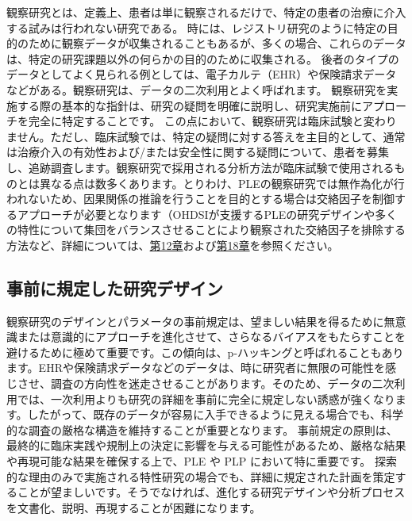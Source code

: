 \documentclass[
  11pt]{book}
\theoremstyle{definition}
\theoremstyle{definition}
\theoremstyle{definition}
\theoremstyle{definition}
\theoremstyle{remark}
\begin{document}
観察研究とは、定義上、患者は単に観察されるだけで、特定の患者の治療に介入する試みは行われない研究である。 時には、レジストリ研究のように特定の目的のために観察データが収集されることもあるが、多くの場合、これらのデータは、特定の研究課題以外の何らかの目的のために収集される。 後者のタイプのデータとしてよく見られる例としては、電子カルテ（EHR）や保険請求データなどがある。観察研究は、データの二次利用とよく呼ばれます。 観察研究を実施する際の基本的な指針は、研究の疑問を明確に説明し、研究実施前にアプローチを完全に特定することです。 この点において、観察研究は臨床試験と変わりません。ただし、臨床試験では、特定の疑問に対する答えを主目的として、通常は治療介入の有効性および/または安全性に関する疑問について、患者を募集し、追跡調査します。観察研究で採用される分析方法が臨床試験で使用されるものとは異なる点は数多くあります。とりわけ、PLEの観察研究では無作為化が行われないため、因果関係の推論を行うことを目的とする場合は交絡因子を制御するアプローチが必要となります（OHDSIが支援するPLEの研究デザインや多くの特性について集団をバランスさせることにより観察された交絡因子を排除する方法など、詳細については、\href{https://ohdsi.github.io/TheBookOfOhdsi/PopulationLevelEstimation.html\#PopulationLevelEstimation}{第12章}および\href{https://ohdsi.github.io/TheBookOfOhdsi/MethodValidity.html\#MethodValidity}{第18章}を参照ください。

\subsection{事前に規定した研究デザイン}\label{ux4e8bux524dux306bux898fux5b9aux3057ux305fux7814ux7a76ux30c7ux30b6ux30a4ux30f3}

観察研究のデザインとパラメータの事前規定は、望ましい結果を得るために無意識または意識的にアプローチを進化させて、さらなるバイアスをもたらすことを避けるために極めて重要です。この傾向は、p-ハッキングと呼ばれることもあります。EHRや保険請求データなどのデータは、時に研究者に無限の可能性を感じさせ、調査の方向性を迷走させることがあります。そのため、データの二次利用では、一次利用よりも研究の詳細を事前に完全に規定しない誘惑が強くなります。したがって、既存のデータが容易に入手できるように見える場合でも、科学的な調査の厳格な構造を維持することが重要となります。 事前規定の原則は、最終的に臨床実践や規制上の決定に影響を与える可能性があるため、厳格な結果や再現可能な結果を確保する上で、PLE や PLP において特に重要です。 探索的な理由のみで実施される特性研究の場合でも、詳細に規定された計画を策定することが望ましいです。そうでなければ、進化する研究デザインや分析プロセスを文書化、説明、再現することが困難になります。
\end{document}
